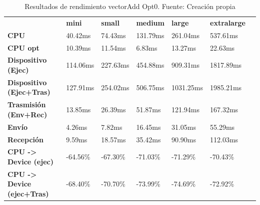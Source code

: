 \begin{table}[H]
    \centering
    \begin{tabular}{lllllll}
    \rowcolor[HTML]{DAE8FC} \ &  \textbf{mini} &  \textbf{small} &  \textbf{medium} &  \textbf{	large} &  \textbf{	extralarge} \\
    \cellcolor[HTML]{DAE8FC} \textbf{CPU} & 40.42ms & 74.43ms & 131.79ms & 	261.04ms & 	537.61ms \\
    \rowcolor[HTML]{EFEFEF} \cellcolor[HTML]{DAE8FC} \textbf{CPU opt} & 10.39ms & 11.54ms & 6.83ms & 	13.27ms & 	22.63ms \\
    \cellcolor[HTML]{DAE8FC} \textbf{Dispositivo (Ejec)} & 114.06ms & 227.63ms & 454.88ms & 	909.31ms & 	1817.89ms \\
    \rowcolor[HTML]{EFEFEF} \cellcolor[HTML]{DAE8FC} \textbf{Dispositivo (Ejec+Tras)} & 127.91ms & 254.02ms & 506.75ms & 	1031.25ms & 	1985.21ms \\
    \cellcolor[HTML]{DAE8FC} \textbf{Trasmisión (Env+Rec)} & 13.85ms & 26.39ms & 51.87ms & 	121.94ms & 	167.32ms \\
    \rowcolor[HTML]{EFEFEF} \cellcolor[HTML]{DAE8FC} \textbf{Envío} & 4.26ms & 7.82ms & 16.45ms & 	31.05ms & 	55.29ms \\
    \cellcolor[HTML]{DAE8FC} \textbf{Recepción} & 9.59ms & 18.57ms & 35.42ms & 	90.90ms & 	112.03ms \\
    \rowcolor[HTML]{EFEFEF} \cellcolor[HTML]{DAE8FC} \textbf{CPU -> Device (ejec)} & -64.56\% & -67.30\% & -71.03\% & 	-71.29\% & 	-70.43\% \\
    \cellcolor[HTML]{DAE8FC} \textbf{CPU -> Device (ejec+Tras)} & -68.40\% & -70.70\% & -73.99\% & 	-74.69\% & 	-72.92\% \\
    \end{tabular}
    \caption[Resultados de rendimiento vectorAdd Opt0]{{Resultados de rendimiento vectorAdd Opt0. Fuente: Creación propia}}
    \label{table_test_vectorAdd_Opt0_hw_performanceResults}
\end{table}